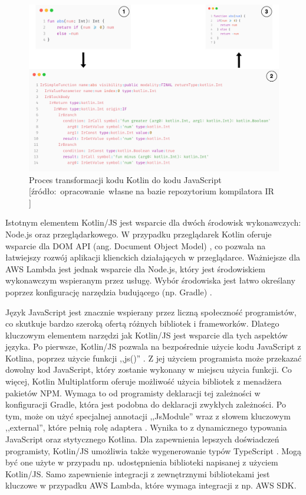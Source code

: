 \begin{figure}[h]
    \centering
    \includegraphics[width=1\textwidth]{charts/kotlin-js-ir.drawio.png}
    \caption{Proces transformacji kodu Kotlin do kodu JavaScript [źródło:~opracowanie~własne na bazie repozytorium kompilatora IR \cite{kotlinIrCompilatorGithub}]}
    \label{fig:kotlin_js_ir}
\end{figure}

Istotnym elementem Kotlin/JS jest wsparcie dla dwóch środowisk wykonawczych: Node.js oraz przeglądarkowego.
W przypadku przeglądarek Kotlin oferuje wsparcie dla DOM API (ang. Document Object Model) \cite{kotlinlangKotlinDocs}, co pozwala na łatwiejszy rozwój aplikacji klienckich działających w przeglądarce.
Ważniejsze dla AWS Lambda jest jednak wsparcie dla Node.js, który jest środowiskiem wykonawczym wspieranym przez usługę.
Wybór środowiska jest łatwo określany poprzez konfigurację narzędzia budującego (np. Gradle) \cite{kotlinlangKotlinDocs}.

Język JavaScript jest znacznie wspierany przez liczną społeczność programistów, co skutkuje bardzo szeroką ofertą różnych bibliotek i frameworków.
Dlatego kluczowym elementem narzędzi jak Kotlin/JS jest wsparcie dla tych aspektów języka.
Po pierwsze, Kotlin/JS pozwala na bezpośrednie użycie kodu JavaScript z Kotlina, poprzez użycie funkcji ,,js()'' \cite{kotlinlangKotlinDocs}.
Z jej użyciem programista może przekazać dowolny kod JavaScript, który zostanie wykonany w miejscu użycia funkcji.
Co więcej, Kotlin Multiplatform oferuje możliwość użycia bibliotek z menadżera pakietów NPM.
Wymaga to od programisty deklaracji tej zależności w konfiguracji Gradle, która jest podobna do deklaracji zwykłych zależności.
Po tym, może on użyć specjalnej annotacji ,,JsModule'' wraz z słowem kluczowym ,,external'', które pełnią rolę adaptera \cite{kotlinlangKotlinDocs}.
Wynika to z dynamicznego typowania JavaScript oraz stytycznego Kotlina. 
Dla zapewnienia lepszych doświadczeń programisty, Kotlin/JS umożliwia także wygenerowanie typów TypeScript \cite{kotlinlangKotlinDocs}.
Mogą być one użyte w przypadu np. udostępnienia biblioteki napisanej z użyciem Kotlin/JS.
Samo zapewnienie integracji z zewnętrznymi bibliotekami jest kluczowe w przypadku AWS Lambda, które wymaga integracji z np. AWS SDK.

